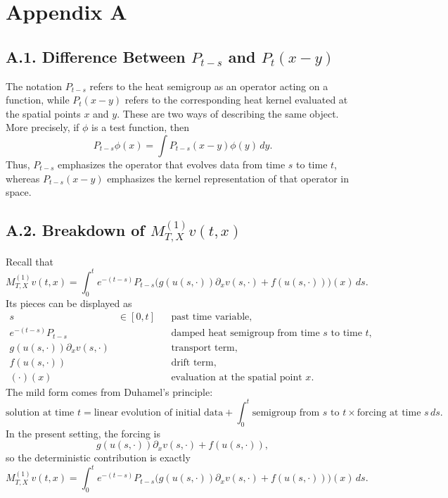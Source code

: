 \documentclass[11pt]{article}
\theoremstyle{definition}
\theoremstyle{remark}
\begin{document}
\appendix
\section*{Appendix A}
\subsection*{A.1. Difference Between $P_{t-s}$ and $P_t(x-y)$}
The notation $P_{t-s}$ refers to the heat semigroup as an operator acting on a function, while $P_t(x-y)$ refers to the corresponding heat kernel evaluated at the spatial points $x$ and $y$. These are two ways of describing the same object. More precisely, if $\phi$ is a test function, then
\[
P_{t-s}\phi(x)=\int P_{t-s}(x-y)\phi(y)\,dy.
\]
Thus, $P_{t-s}$ emphasizes the operator that evolves data from time $s$ to time $t$, whereas $P_{t-s}(x-y)$ emphasizes the kernel representation of that operator in space.

\subsection*{A.2. Breakdown of $M_{T,X}^{(1)}v(t,x)$}
Recall that
\[
M_{T,X}^{(1)}v(t,x)=\int_0^t e^{-(t-s)}P_{t-s}\bigl(g(u(s,\cdot))\partial_x v(s,\cdot)+f(u(s,\cdot))\bigr)(x)\,ds.
\]
Its pieces can be displayed as
\[
\begin{aligned}
s &\in [0,t] && \text{past time variable},\\
e^{-(t-s)}P_{t-s} &&& \text{damped heat semigroup from time } s \text{ to time } t,\\
g(u(s,\cdot))\partial_x v(s,\cdot) &&& \text{transport term},\\
f(u(s,\cdot)) &&& \text{drift term},\\
(\cdot)(x) &&& \text{evaluation at the spatial point } x.
\end{aligned}
\]
The mild form comes from Duhamel's principle:
\[
\text{solution at time } t
=
\text{linear evolution of initial data}
+
\int_0^t
\text{semigroup from } s \text{ to } t
\times
\text{forcing at time } s
\,ds.
\]
In the present setting, the forcing is
\[
g(u(s,\cdot))\partial_x v(s,\cdot)+f(u(s,\cdot)),
\]
so the deterministic contribution is exactly
\[
M_{T,X}^{(1)}v(t,x)
=
\int_0^t
e^{-(t-s)}P_{t-s}
\bigl(g(u(s,\cdot))\partial_x v(s,\cdot)+f(u(s,\cdot))\bigr)(x)\,ds.
\]
\end{document}
